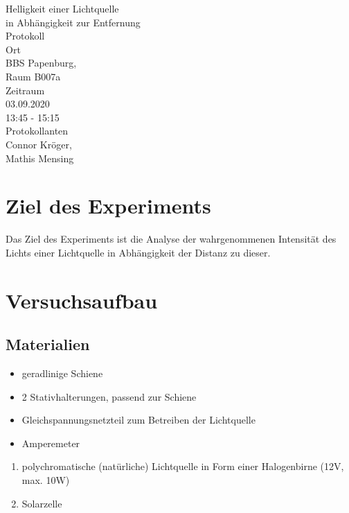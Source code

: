 \documentclass[12pt, a4paper]{article}
\begin{document}
\begin{titlepage}
\begin{center}
    \LARGE{Helligkeit einer Lichtquelle\\in Abhängigkeit zur Entfernung} \\
    \large{Protokoll} \\
    \vspace{10mm}
    \small{Ort} \\
    \Large{ BBS Papenburg,\\ 
            Raum B007a} \\
    \vspace{10mm}
    \small{Zeitraum} \\
    \Large{ 03.09.2020 \\
            13:45 - 15:15} \\
    \vspace{15mm}
    \small{Protokollanten} \\
    \Large{ Connor Kröger,\\
            Mathis Mensing}
\end{center}

\thispagestyle{empty}
\end{titlepage}

\tableofcontents
\newpage

\section{Ziel des Experiments}
Das Ziel des Experiments ist die Analyse der wahrgenommenen Intensität des Lichts einer Lichtquelle in Abhängigkeit der Distanz zu dieser.

\section{Versuchsaufbau}
\subsection{Materialien}

\begin{itemize}
    \item geradlinige Schiene
    \item 2 Stativhalterungen, passend zur Schiene
    \item Gleichspannungsnetzteil zum Betreiben der Lichtquelle
    \item Amperemeter
\end{itemize}
\begin{enumerate}
    \item polychromatische (nat\"urliche) Lichtquelle in Form einer Halogenbirne (12V, max. 10W)
    \item Solarzelle
\end{enumerate}
\end{document}
